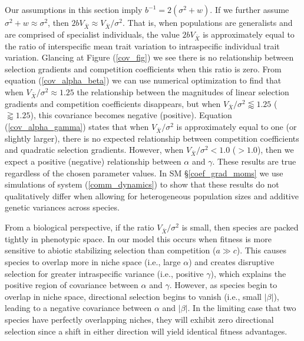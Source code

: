 \documentclass[]{elsarticle} %
\begin{document}
Our assumptions in this section imply \(b^{-1}=2(\sigma^2+w)\). If we
further assume \(\sigma^2+w\approx\sigma^2\), then
\(2bV_{\bar X}\approx V_{\bar X}/\sigma^2\). That is, when populations
are generalists and are comprised of specialist individuals, the value
\(2bV_{\bar X}\) is approximately equal to the ratio of interspecific
mean trait variation to intraspecific individual trait variation.
Glancing at Figure (\ref{cov_fig}) we see there is no relationship
between selection gradients and competition coefficients when this ratio
is zero. From equation (\ref{cov_alpha_beta}) we can use numerical
optimization to find that when \(V_{\bar X}/\sigma^2\approx1.25\) the
relationship between the magnitudes of linear selection gradients and
competition coefficients disappears, but when
\(V_{\bar X}/\sigma^2\lessapprox1.25\) (\(\gtrapprox1.25\)), this
covariance becomes negative (positive). Equation (\ref{cov_alpha_gamma})
states that when \(V_{\bar X}/\sigma^2\) is approximately equal to one
(or slightly larger), there is no expected relationship between
competition coefficients and quadratic selection gradients. However,
when \(V_{\bar X}/\sigma^2<1.0\) (\(>1.0\)), then we expect a positive
(negative) relationship between \(\alpha\) and \(\gamma\). These results
are true regardless of the chosen parameter values. In SM
\S\ref{coef_grad_moms} we use simulations of system
(\ref{comm_dynamics}) to show that these results do not qualitatively
differ when allowing for heterogeneous population sizes and additive
genetic variances across species.

From a biological perspective, if the ratio \(V_{\bar X}/\sigma^2\) is
small, then species are packed tightly in phenotypic space. In our model
this occurs when fitness is more sensitive to abiotic stabilizing
selection than competition (\(a\gg c\)). This causes species to overlap
more in niche space (i.e., large \(\alpha\)) and creates disruptive
selection for greater intraspecific variance (i.e., positive
\(\gamma\)), which explains the positive region of covariance between
\(\alpha\) and \(\gamma\). However, as species begin to overlap in niche
space, directional selection begins to vanish (i.e., small \(|\beta|\)),
leading to a negative covariance between \(\alpha\) and \(|\beta|\). In
the limiting case that two species have perfectly overlapping niches,
they will exhibit zero directional selection since a shift in either
direction will yield identical fitness advantages.
\end{document}
